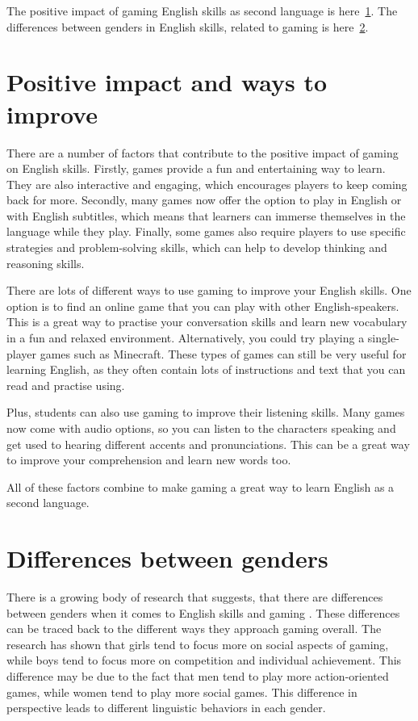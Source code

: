 \documentclass[10pt,twoside,english,a4paper]{article}
\begin{document}
The positive impact of gaming English skills as second language is here~\ref{positives}.
The differences between genders in English skills, related to gaming is here~\ref{genders}.




\section{Positive impact and ways to improve} \label{positives}
There are a number of factors that contribute to the positive impact of gaming on English skills. Firstly, games provide a fun and entertaining way to learn. They are also interactive and engaging, which encourages players to keep coming back for more. Secondly, many games now offer the option to play in English or with English subtitles, which means that learners can immerse themselves in the language while they play. Finally, some games also require players to use specific strategies and problem-solving skills, which can help to develop thinking and reasoning skills.

There are lots of different ways to use gaming to improve your English skills. One option is to find an online game that you can play with other English-speakers. This is a great way to practise your conversation skills and learn new vocabulary in a fun and relaxed environment. Alternatively, you could try playing a single-player games such as Minecraft. These types of games can still be very useful for learning English, as they often contain lots of instructions and text that you can read and practise using.

Plus, students can also use gaming to improve their listening skills. Many games now come with audio options, so you can listen to the characters speaking and get used to hearing different accents and pronunciations. This can be a great way to improve your comprehension and learn new words too. 

All of these factors combine to make gaming a great way to learn English as a second language. 

\section{Differences between genders} \label{genders}
There is a growing body of research that suggests, that there are differences between genders when it comes to English skills and gaming \cite{Gender_diff}. These differences can be traced back to the different ways they approach gaming overall. The research has shown that girls tend to focus more on social aspects of gaming, while boys tend to focus more on competition and individual achievement. This difference may be due to the fact that men tend to play more action-oriented games, while women tend to play more social games. This difference in perspective leads to different linguistic behaviors in each gender. 
\end{document}
